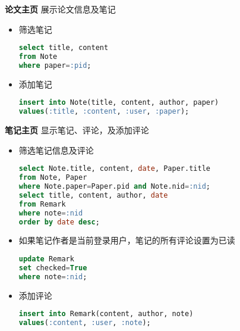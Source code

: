 \noindent
{\bf 论文主页} 展示论文信息及笔记
\begin{itemize}
\item 筛选笔记
\begin{lstlisting}[language=SQL]
select title, content
from Note
where paper=:pid;
\end{lstlisting}
\item 添加笔记
\begin{lstlisting}[language=SQL]
insert into Note(title, content, author, paper)
values(:title, :content, :user, :paper);
\end{lstlisting}
\end{itemize}
{\bf 笔记主页} 显示笔记、评论，及添加评论
\begin{itemize}
\item 筛选笔记信息及评论
\begin{lstlisting}[language=SQL]
select Note.title, content, date, Paper.title
from Note, Paper
where Note.paper=Paper.pid and Note.nid=:nid;
select title, content, author, date
from Remark
where note=:nid
order by date desc;
\end{lstlisting}
\item 如果笔记作者是当前登录用户，笔记的所有评论设置为已读
\begin{lstlisting}[language=SQL]
update Remark
set checked=True
where note=:nid;
\end{lstlisting}
\item 添加评论
\begin{lstlisting}[language=SQL]
insert into Remark(content, author, note)
values(:content, :user, :note);
\end{lstlisting}
\end{itemize}